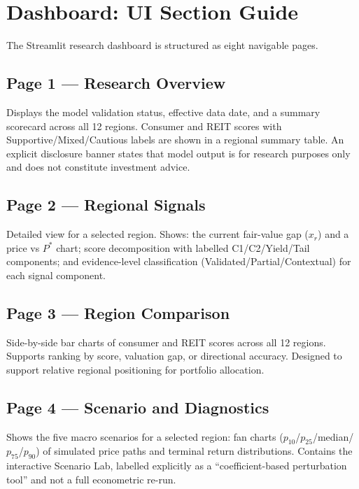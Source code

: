 \documentclass[11pt,a4paper]{article}
\theoremstyle{plain}
\theoremstyle{definition}
\newcommand{\Pstar}{P^{*}}
\begin{document}
\section{Dashboard: UI Section Guide}

The Streamlit research dashboard is structured as eight navigable pages.

\subsection{Page 1 --- Research Overview}

Displays the model validation status, effective data date, and a summary
scorecard across all 12 regions.  Consumer and REIT scores with
Supportive/Mixed/Cautious labels are shown in a regional summary table.
An explicit disclosure banner states that model output is for research
purposes only and does not constitute investment advice.

\subsection{Page 2 --- Regional Signals}

Detailed view for a selected region.  Shows: the current fair-value gap
($x_r$) and a price vs $\Pstar$ chart; score decomposition with
labelled C1/C2/Yield/Tail components; and evidence-level classification
(Validated/Partial/Contextual) for each signal component.

\subsection{Page 3 --- Region Comparison}

Side-by-side bar charts of consumer and REIT scores across all 12 regions.
Supports ranking by score, valuation gap, or directional accuracy.
Designed to support relative regional positioning for portfolio allocation.

\subsection{Page 4 --- Scenario and Diagnostics}

Shows the five macro scenarios for a selected region: fan charts
($p_{10}$/$p_{25}$/median/$p_{75}$/$p_{90}$) of simulated price paths
and terminal return distributions.  Contains the interactive Scenario Lab,
labelled explicitly as a ``coefficient-based perturbation tool'' and not
a full econometric re-run.
\end{document}
